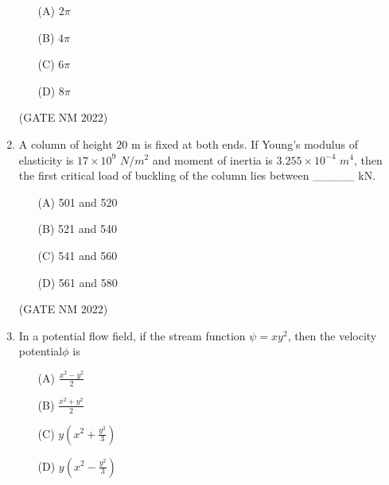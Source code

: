 \documentclass[journal,12pt,onecolumn]{IEEEtran}
\theoremstyle{remark}
\begin{document}
\begin{enumerate}
\begin{multicols}{4}

\begin{enumerate}
    \item[(A)] $2\pi$
    \item[(B)] $4\pi$
    \item[(C)] $6\pi$
    \item[(D)] $8\pi$
\end{enumerate}

\end{multicols}

\hfill(GATE NM 2022)







\item  A column of height $20$ m  is fixed at both ends.  
If Young's modulus of elasticity is $17 \times 10^{9}$ $ N/m^2 $ and moment of inertia is $3.255 \times  10^{-4}$ $ m^4 $, then the first critical load of buckling of the column lies between \_\_\_\_\_ kN.

\begin{multicols}{4}

\begin{enumerate}
    \item[(A)] 501 and 520
    \item[(B)] 521 and 540
    \item[(C)] 541 and 560
    \item[(D)] 561 and 580
\end{enumerate}

\end{multicols}

\hfill(GATE NM 2022)










\item  In a potential flow field, if the stream function $\psi = x y^2$, then the velocity potential$\phi$ is

	\begin{multicols}{2}

\begin{enumerate}
	\item[(A)] $\frac{x^2 - y^2}{2} $
	\item[(B)] $\frac{x^2 + y^2}{2} $
	\item[(C)] $y(x^2 + \frac{y^2}{3}) $
	\item[(D)] $y(x^2 - \frac{y^2}{3}) $
\end{enumerate}


\end{multicols}
\end{enumerate}
\end{document}
